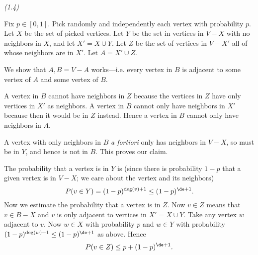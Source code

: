 \begin{problem} {\it (1.4)}

Fix $p\in [0,1]$. Pick randomly and independently each vertex with probability $p$. Let $X$ be the set of picked vertices. %
Let $Y$ be the set in vertices in $V-X$ with no neighbors in $X$, and let $X'=X\cup Y$. Let $Z$ be the set of vertices in $V-X'$ all of whose neighbors are in $X'$. Let $A=X'\cup Z$. 

We show that $A, B=V-A$ works---i.e. every vertex in $B$ is adjacent to some vertex of $A$ and some vertex of $B$.

A vertex in $B$ cannot have neighbors in $Z$ because the vertices in $Z$ have only vertices in $X'$ as neighbors. A vertex in $B$ cannot only have neighbors in $X'$ because then it would be in $Z$ instead. Hence  a vertex in $B$ cannot only have neighbors in $A$.

A vertex with only neighbors in $B$ {\it a fortiori} only has neighbors  in $V-X$, so must be in $Y$, and hence is not in $B$. This proves our claim.

The probability that a vertex is in $Y$ is (since there is probability $1-p$ that a given vertex is in $V-X$; we care about the vertex and its neighbors)
\[
P(v\in Y)=(1-p)^{\deg(v)+1}\leq (1-p)^{\de+1}.
\]
Now we estimate the probability that a vertex is in $Z$. Now $v\in Z$ means that $v\in B-X$ and $v$ is only adjacent to vertices in $X'=X\cup Y$. %
Take any vertex $w$ adjacent to $v$. Now $w\in X$ with probability $p$ and $w\in Y$ with probability $(1-p)^{\deg(w)+1}\leq (1-p)^{\de+1}$ as above. Hence
\[
P(v\in Z)\leq p+(1-p)^{\de+1}.
\]


\end{problem}
